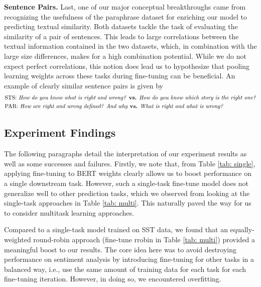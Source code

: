 \documentclass{article}
\begin{document}
\textbf{Sentence Pairs.} Last, one of our major conceptual breakthroughs came from recognizing the usefulness of the paraphrase dataset for enriching our model to predicting textual similarity. Both datasets tackle the task of evaluating the similarity of a pair of sentences. This leads to large correlations between the textual information contained in the two datasets, which, in combination with the large size differences, makes for a high combination potential. While we do not expect perfect correlations, this notion does lead us to hypothesize that pooling learning weights across these tasks during fine-tuning can be beneficial. An example of clearly similar sentence pairs is given by
\begin{align*}
    &\text{STS: \textit{How do you know what is right and wrong?} \textbf{vs.} \textit{How do you know which story is the right one?}} \\
    &\text{PAR: \textit{How are right and wrong defined? And why} \textbf{vs.} \textit{What is right and what is wrong?}}
\end{align*}

\subsection{Experiment Findings} 
The following paragraphs detail the interpretation of our experiment results as well as some successes and failures. Firstly, we note that, from Table \ref{tab: single}, applying fine-tuning to BERT weights clearly allows us to boost performance on a single downstream task. However, such a single-task fine-tune model does not generalize well to other prediction tasks, which we observed from looking at the single-task approaches in Table \ref{tab: multi}. This naturally paved the way for us to consider multitask learning approaches.   

Compared to a single-task model trained on SST data, we found that an equally-weighted round-robin approach (fine-tune rrobin in Table \ref{tab: multi}) provided a meaningful boost to our results. The core idea here was to avoid destroying performance on sentiment analysis by introducing fine-tuning for other tasks in a balanced way, i.e., use the same amount of training data for each task for each fine-tuning iteration. However, in doing so, we encountered overfitting.  
\end{document}
